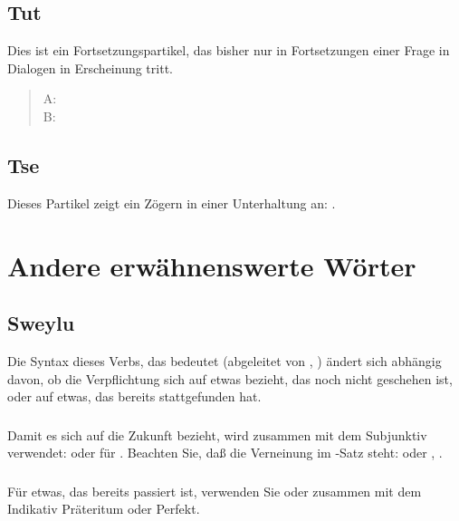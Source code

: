\subsection{Tut} Dies ist ein Fortsetzungspartikel, das bisher nur in Fortsetzungen einer
Frage in Dialogen in Erscheinung tritt.

\begin{quotation}
\noindent A:   \\
\noindent B:  
\end{quotation}

\subsection{Tse} Dieses Partikel zeigt ein Z\"ogern in einer Unterhaltung an:
.


\section{Andere erw\"ahnenswerte W\"orter}

\subsection{Sweylu}\label{syn:sweylu} Die Syntax dieses Verbs, das  bedeutet
(abgeleitet von , ) \"andert sich abh\"angig davon, ob
die Verpflichtung sich auf etwas bezieht, das noch nicht geschehen ist, oder auf etwas,
das bereits stattgefunden hat.

\subsubsection{} Damit es sich auf die Zukunft bezieht, wird  zusammen mit dem
Subjunktiv verwendet:  oder  f\"ur . Beachten Sie, da\ss{} die Verneinung
im -Satz steht:  oder ,
.

\subsubsection{} F\"ur etwas, das bereits passiert ist, verwenden Sie  oder 
zusammen mit dem Indikativ Pr\"ateritum oder Perfekt.

